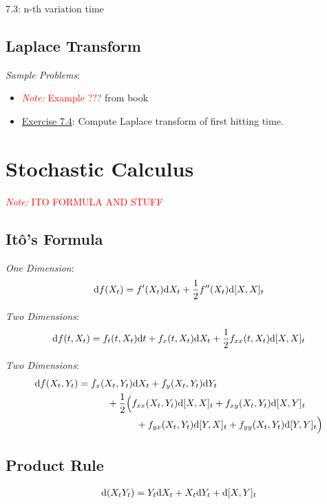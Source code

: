 \documentclass[12pt]{article}
\newcommand{\note}[1]{\textcolor{red}{\textit{Note:} #1}}
\begin{document}
7.3: n-th variation time


\subsection{Laplace Transform}
\textit{Sample Problems}: 
\begin{itemize}[nolistsep]
    \item \note{Example ???} from book
    \item \hyperref[Exercise 7.4]{Exercise 7.4}: Compute Laplace transform of first hitting time.
\end{itemize}


\pagebreak
\section{Stochastic Calculus}

\note{ITO FORMULA AND STUFF}
\subsection{It\^o's Formula}
\textit{One Dimension}:
\begin{align*}
    \mathrm{d} f(X_t) = f'(X_t)\mathrm{d} X_t + \frac{1}{2}f''(X_t)\mathrm{d}[X,X]_t
\end{align*}

\textit{Two Dimensions}:
\begin{align*}
    \mathrm{d} f(t,X_t) = f_t(t,X_t)\mathrm{d} t + f_x(t,X_t)\mathrm{d} X_t + \frac{1}{2}f_{xx}(t,X_t) \mathrm{d}[X,X]_t
\end{align*}

\textit{Two Dimensions}:
\begin{align*}
    \mathrm{d} f(X_t,Y_t) &= f_x(X_t,Y_t)\mathrm{d} X_t + f_y(X_t,Y_t)\mathrm{d} Y_t 
    \\&\hspace{3em} + \frac{1}{2} \Big( f_{xx}(X_t,Y_t)\mathrm{d}[X,X]_t + f_{xy}(X_t,Y_t)\mathrm{d}[X,Y]_t 
    \\&\hspace{6em}+ f_{yx}(X_t,Y_t)\mathrm{d}[Y,X]_t + f_{yy}(X_t,Y_t)\mathrm{d}[Y,Y]_t \Big)
\end{align*}

\subsection{Product Rule}
\begin{align*}
    \mathrm{d}(X_tY_t) = Y_t\mathrm{d} X_t + X_t \mathrm{d} Y_t + \mathrm{d}[X,Y]_t 
\end{align*}
\end{document}
